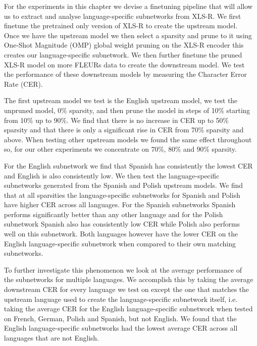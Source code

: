 For the experiments in this chapter we devise a finetuning pipeline that will allow us to extract and analyse language-specific subnetworks from XLS-R. We first finetune the pretrained only version of XLS-R to create the upstream model. Once we have the upstream model we then select a sparsity and prune to it using One-Shot Magnitude (OMP) global weight pruning on the XLS-R encoder this creates our language-specific subnetwork. We then further finetune the pruned XLS-R model on more FLEURs data to create the downstream model. We test the performance of these downstream models by measuring the Character Error Rate (CER).

The first upstream model we test is the English upstream model, we test the unpruned model, 0\% sparsity, and then prune the model in steps of 10\% starting from 10\% up to 90\%. We find that there is no increase in CER up to 50\% sparsity and that there is only a significant rise in CER from 70\% sparsity and above. When testing other upstream models we found the same effect throughout so, for our other experiments we concentrate on 70\%, 80\% and 90\% sparsity. 

For the English subnetwork we find that Spanish has consistently the lowest CER and English is also consistently low. We then test the language-specific subnetworks generated from the Spanish and Polish upstream models. We find that at all sparsities the language-specific subnetworks for Spanish and Polish have higher CER across all languages. For the Spanish subnetworks Spanish performs significantly better than any other language and for the Polish subnetwork Spanish also has consistently low CER while Polish also performs well on this subnetwork. Both languages however have the lower CER on the English language-specific subnetwork when compared to their own matching subnetworks.


To further investigate this phenomenon we look at the average performance of the subnetworks for multiple languages. We accomplish this by taking the average downstream CER for every language we test on except the one that matches the upstream language used to create the language-specific subnetwork itself, i.e. taking the average CER for the English language-specific subnetwork when tested on French, German, Polish and Spanish, but not English. We found that the English language-specific subnetworks had the lowest average CER across all languages that are not English.

